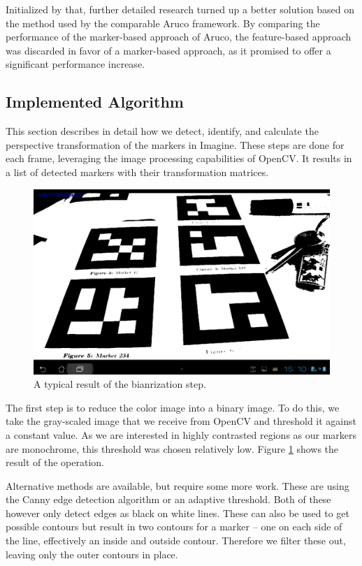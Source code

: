 Initialized by that, further detailed research turned up a better solution based on the method used by the comparable Aruco\cite{aruco} framework.
By comparing the performance of the marker-based approach of Aruco, the feature-based approach was discarded in favor of a marker-based approach, as it promised to offer a significant performance increase.

\subsection{Implemented Algorithm}
\label{detection_workflow}

This section describes in detail how we detect, identify, and calculate the perspective transformation of the markers in Imagine.
These steps are done for each frame, leveraging the image processing capabilities of OpenCV.
It results in a list of detected markers with their transformation matrices.

\begin{figure}[H]
	\centering
	\includegraphics[width=14cm]{img/binary.png}
	\caption[Binarization]{A typical result of the bianrization step.}
	\label{fig:binary}
\end{figure}

The first step is to reduce the color image into a binary image.
To do this, we take the gray-scaled image that we receive from OpenCV and threshold it against a constant value.
As we are interested in highly contrasted regions as our markers are monochrome, this threshold was chosen relatively low.
Figure \ref{fig:binary} shows the result of the operation.

Alternative methods are available, but require some more work.
These are using the Canny edge detection algorithm \cite{canny} or an adaptive threshold.
Both of these however only detect edges as black on white lines.
These can also be used to get possible contours but result in two contours for a marker – one on each side of the line, effectively an inside and outside contour.
Therefore we filter these out, leaving only the outer contours in place.

